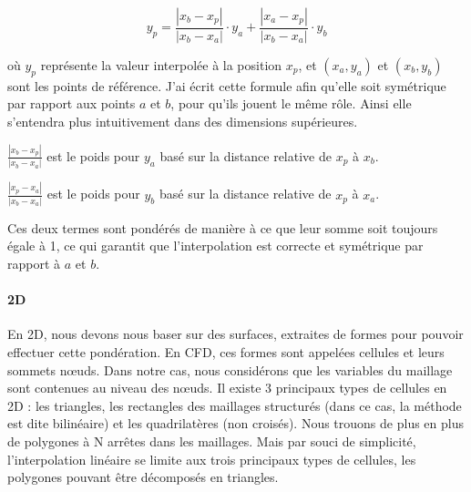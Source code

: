 \begin{equation}
y_p = \frac{|x_b - x_p|}{|x_b - x_a|} \cdot y_a + \frac{|x_a - x_p|}{|x_b - x_a|} \cdot y_b
\end{equation}

où \( y_p \) représente la valeur interpolée à la position \( x_p \), et \((x_a, y_a)\) et \((x_b, y_b)\) sont les points de référence. J'ai écrit cette formule afin qu'elle soit symétrique par rapport aux points \( a \) et \( b \), pour qu'ils jouent le même rôle. Ainsi elle s'entendra plus intuitivement dans des dimensions supérieures.
\vspace{0.5cm}

        \( \frac{|x_b - x_p|}{|x_b - x_a|} \) est le poids pour \( y_a \) basé sur la distance relative de \( x_p \) à \( x_b \).

        \( \frac{|x_p - x_a|}{|x_b - x_a|} \) est le poids pour \( y_b \) basé sur la distance relative de \( x_p \) à \( x_a \).\vspace{0.5cm}

Ces deux termes sont pondérés de manière à ce que leur somme soit toujours égale à 1, ce
qui garantit que l'interpolation est correcte et symétrique par rapport à \( a \) et \( b \).\vspace{0.5cm}


\paragraph{2D}

\vspace{0.5cm}

En 2D, nous devons nous baser sur des surfaces, extraites de formes pour pouvoir effectuer cette pondération. En CFD, ces formes sont appelées cellules et leurs sommets nœuds. Dans notre cas, nous considérons que les variables du maillage sont contenues au niveau des nœuds. 
Il existe 3 principaux types de cellules en 2D : les triangles, les rectangles des maillages structurés (dans ce cas, la méthode est dite bilinéaire) et les quadrilatères (non croisés).
Nous trouons de plus en plus de polygones à N arrêtes dans les maillages. Mais par souci de simplicité, l'interpolation linéaire se limite aux trois principaux types de cellules, les polygones pouvant être décomposés en triangles. %

